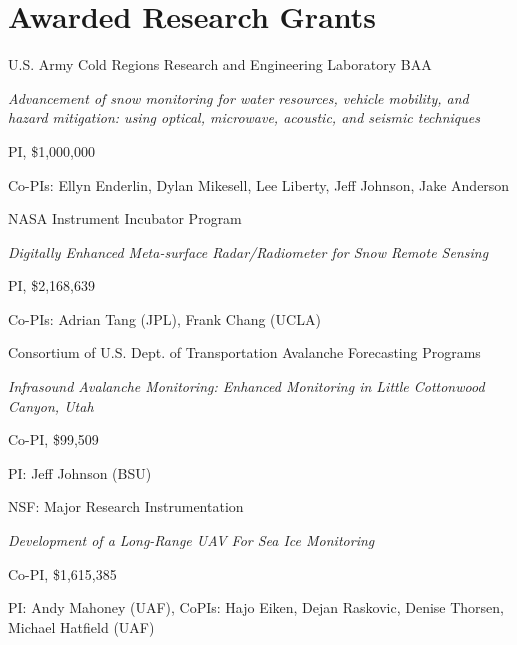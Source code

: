 \documentclass[11pt]{article}
\renewenvironment{itemize}{
  \begin{list}{}{
    \setlength{\leftmargin}{1.5em}
    \setlength{\itemsep}{0pt}
    \setlength{\parskip}{0pt}
  }
}{
  \end{list}
}
\begin{document}
\section*{Awarded Research Grants}
\begin{itemize} 

\item[9/2020-8/2022] U.S. Army Cold Regions Research and Engineering Laboratory BAA
\begin{itemize}
\item \textit{Advancement of snow monitoring for water resources, vehicle mobility, and hazard mitigation: using optical, microwave, acoustic, and seismic techniques}
\item PI, \$1,000,000
\item Co-PIs: Ellyn Enderlin, Dylan Mikesell, Lee Liberty, Jeff Johnson, Jake Anderson
\end{itemize}

\item[2/2020-1/2023] NASA Instrument Incubator Program
\begin{itemize}
\item \textit{Digitally Enhanced Meta-surface Radar/Radiometer for Snow Remote Sensing}
\item PI, \$2,168,639
\item Co-PIs: Adrian Tang (JPL), Frank Chang (UCLA)
\end{itemize}

\item[7/2019-12/2021] Consortium of U.S. Dept. of Transportation Avalanche Forecasting Programs
\begin{itemize}
\item \textit{Infrasound Avalanche Monitoring: Enhanced Monitoring in Little Cottonwood Canyon, Utah}
\item Co-PI, \$99,509
\item PI: Jeff Johnson (BSU)
\end{itemize}

\item[9/2018-8/2022] NSF: Major Research Instrumentation
\begin{itemize}
  \item \textit{Development of a Long-Range UAV For Sea Ice Monitoring}
  \item Co-PI, \$1,615,385
  \item PI: Andy Mahoney (UAF),  CoPIs: Hajo Eiken, Dejan Raskovic,  Denise Thorsen, Michael Hatfield (UAF)
\end{itemize}


\end{itemize}
\end{document}
